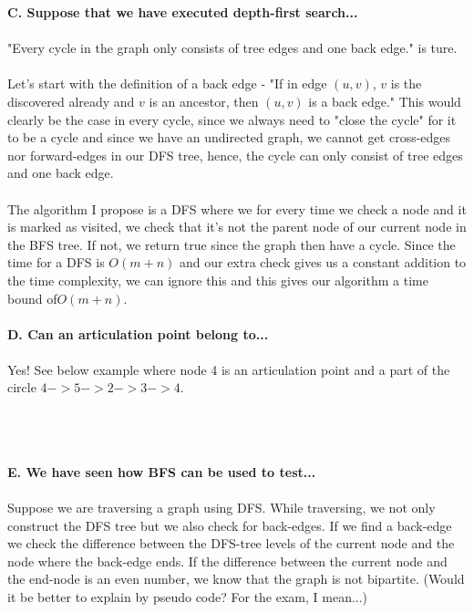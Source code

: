 \documentclass[12pt,oneside,reqno]{amsart}
\begin{document}
\textbf{C. Suppose that we have executed depth-first search...}\\\\
"Every cycle in the graph only consists of tree edges and one back edge." is ture.\\\\
Let's start with the definition of a back edge - "If in edge $(u,v)$, $v$ is the discovered already and $v$ is an ancestor, then $(u,v)$ is a back edge." This would clearly be the case in every cycle, since we always need to "close the cycle" for it to be a cycle and since we have an undirected graph, we cannot get cross-edges nor forward-edges in our DFS tree, hence, the cycle can only consist of tree edges and one back edge.\\\\
The algorithm I propose is a DFS where we for every time we check a node and it is marked as visited, we check that it's not the parent node of our current node in the BFS tree. If not, we return true since the graph then have a cycle. Since the time for a DFS is $O(m+n)$ and our extra check gives us a constant addition to the time complexity, we can ignore this and this gives our algorithm a time bound of$O(m+n)$.\\\\
\newpage
\textbf{D. Can an articulation point belong to...}\\\\
Yes! See below example where node 4 is an articulation point and a part of the circle $4->5->2->3->4$.\\\\
\\\\
\textbf{E. We have seen how BFS can be used to test...}\\\\
Suppose we are traversing a graph using DFS. While traversing, we not only construct the DFS tree but we also check for back-edges. If we find a back-edge we check the difference between the DFS-tree levels of the current node and the node where the back-edge ends. If the difference between the current node and the end-node is an even number, we know that the graph is not bipartite. (Would it be better to explain by pseudo code? For the exam, I mean...)\\\\
\end{document}
